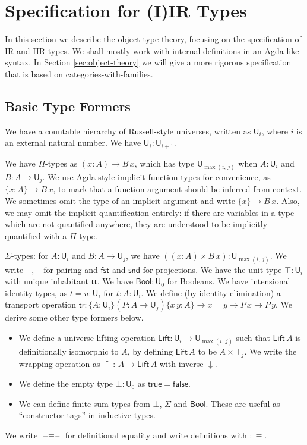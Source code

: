 \documentclass[acmsmall,screen,review,anonymous]{acmart}
\newcommand{\msf}[1]{{\mathsf{#1}}}
\newcommand{\U}{\msf{U}}
\newcommand{\Lift}{\msf{Lift}}
\newcommand{\lup}{\uparrow}
\newcommand{\ldown}{\downarrow}
\newcommand{\ttt}{\msf{tt}}
\newcommand{\blank}{{\mathord{\hspace{1pt}\text{--}\hspace{1pt}}}}
\newcommand{\tr}{\msf{tr}}
\newcommand{\fst}{\msf{fst}}
\newcommand{\snd}{\msf{snd}}
\newcommand{\Bool}{\msf{Bool}}
\newcommand{\true}{\msf{true}}
\newcommand{\false}{\msf{false}}
\begin{document}
\section{Specification for (I)IR Types}\label{sec:specification}

In this section we describe the object type theory, focusing on the specification of IR and IIR
types. We shall mostly work with internal definitions in an Agda-like syntax. In Section
\ref{sec:object-theory} we will give a more rigorous specification that is based on
categories-with-families.

\subsection{Basic Type Formers}\label{sec:basic-type-formers}
We have a countable hierarchy of Russell-style universes, written as $\U_i$, where $i$ is an
external natural number. We have $\U_i : \U_{i + 1}$.

We have $\Pi$-types as $(x : A) \to B\,x$, which has type $\U_{\max(i,\,j)}$ when $A : \U_i$ and $B
: A \to \U_j$. We use Agda-style implicit function types for convenience, as $\{x : A\} \to B\,x$,
to mark that a function argument should be inferred from context. We sometimes omit the type of an
implicit argument and write $\{x\} \to B\,x$.  Also, we may omit the implicit quantification
entirely: if there are variables in a type which are not quantified anywhere, they are understood
to be implicitly quantified with a $\Pi$-type.

$\Sigma$-types: for $A : \U_i$ and $B : A \to \U_j$, we have $((x : A) \times B\,x) :
\U_{\max(i,\,j)}$.  We write $\blank,\blank$ for pairing and $\fst$ and $\snd$ for projections. We
have the unit type $\top : \U_i$ with unique inhabitant $\ttt$. We have $\Bool : \U_0$ for
Booleans. We have intensional identity types, as $t = u : \U_i$ for $t : A : \U_i$. We define (by
identity elimination) a transport operation $\tr : \{A : \U_i\}(P : A \to \U_j)\{x\,y : A\} \to x =
y \to P\,x \to P\,y$. We derive some other type formers below.
\begin{itemize}
  \item We define a universe lifting operation $\Lift : \U_i \to \U_{\max(i,\,j)}$ such that
    $\Lift\,A$ is definitionally isomorphic to $A$, by defining $\Lift\,A$ to be $A \times \top_j$. We
    write the wrapping operation as $\lup\,:\,A \to \Lift\,A$ with inverse $\ldown$.
  \item We define the empty type $\bot : \U_0$ as $\true = \false$.
  \item We can define finite sum types from $\bot$, $\Sigma$ and $\Bool$. These are useful
    as ``constructor tags'' in inductive types.
\end{itemize}
We write $\blank\!\!\equiv\!\!\blank$ for definitional equality and write definitions with $:\equiv$.
\end{document}

